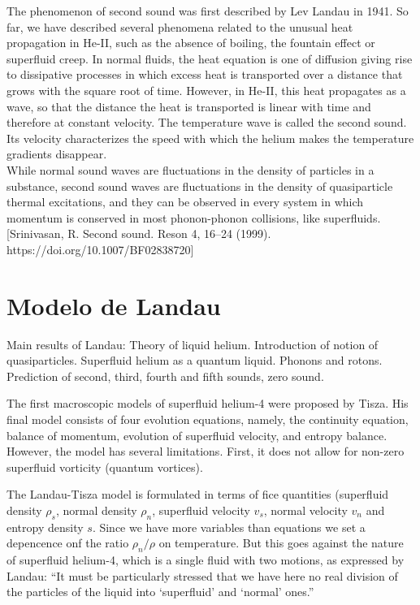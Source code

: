 \documentclass{article}
\begin{document}
The phenomenon of second sound was first described by Lev Landau in 1941. \cite{LevLan}
So far, we have described several phenomena related to the unusual heat propagation in He-II, such as the absence of boiling, the fountain effect or superfluid creep. In normal fluids, the heat equation is one of diffusion giving rise to dissipative processes in which excess heat is transported over a distance that grows with the square root of time. However, in He-II, this heat propagates as a wave, so that the distance the heat is transported is linear with time and therefore at constant velocity. The temperature wave is called the second sound. Its velocity characterizes the speed with which the helium makes the temperature gradients disappear.\\

While normal sound waves are fluctuations in the density of particles in a substance, second sound waves are fluctuations in the density of quasiparticle thermal excitations, and they can be observed in every system in which momentum is conserved in most phonon-phonon collisions, like superfluids. [Srinivasan, R. Second sound. Reson 4, 16–24 (1999). https://doi.org/10.1007/BF02838720]



\section{Modelo de Landau}
\cite{Kincl}
Main results of Landau:
Theory of liquid helium. Introduction of notion of quasiparticles. Superfluid
helium as a quantum liquid. Phonons and rotons. Prediction of second, third,
fourth and fifth sounds, zero sound.

\cite{PhysRev.60.356}

The first macroscopic models of superfluid helium-4 were
proposed by Tisza. His final model consists of four evolution equations, namely, the continuity equation, balance of momentum, evolution of superfluid velocity, and entropy balance. However, the model has several limitations. First, it does not allow for non-zero superfluid vorticity (quantum vortices). 

The Landau-Tisza model is formulated in terms of fice quantities (superfluid density $\rho_s$, normal density $\rho_n$, superfluid velocity $v_s$, normal velocity $v_n$ and entropy density $s$. Since we have more variables than equations we set a depencence onf the ratio $\rho_n/\rho$ on temperature. But this goes against the nature of superfluid helium-4, which is a single fluid with two motions, as expressed by Landau: “It must be particularly stressed that we
have here no real division of the particles of the liquid into ‘superfluid’
and ‘normal’ ones.”
\end{document}
